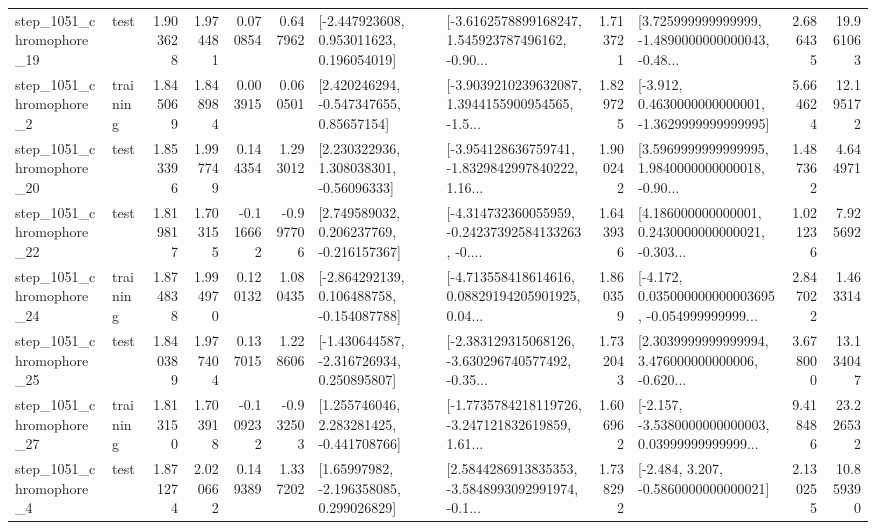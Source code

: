 \begin{tabular}{llrrrrllrlrr}
 step\_1051\_chromophore\_19 &      test &      1.903628 &    1.974481 &      0.070854 &  0.647962 &    [-2.447923608, 0.953011623, 0.196054019] &  [-3.6162578899168247, 1.545923787496162, -0.90... &       1.713721 &  [3.725999999999999, -1.4890000000000043, -0.48... &            2.686435 &         19.961063 \\
  step\_1051\_chromophore\_2 &  training &      1.845069 &    1.848984 &      0.003915 &  0.060501 &     [2.420246294, -0.547347655, 0.85657154] &  [-3.9039210239632087, 1.3944155900954565, -1.5... &       1.829725 &  [-3.912, 0.4630000000000001, -1.3629999999999995] &            5.664624 &         12.195172 \\
 step\_1051\_chromophore\_20 &      test &      1.853396 &    1.997749 &      0.144354 &  1.293012 &     [2.230322936, 1.308038301, -0.56096333] &  [-3.954128636759741, -1.8329842997840222, 1.16... &       1.900242 &  [3.5969999999999995, 1.9840000000000018, -0.90... &            1.487362 &          4.644971 \\
 step\_1051\_chromophore\_22 &      test &      1.819817 &    1.703155 &     -0.116662 & -0.997706 &    [2.749589032, 0.206237769, -0.216157367] &  [-4.314732360055959, -0.24237392584133263, -0.... &       1.643936 &  [4.186000000000001, 0.2430000000000021, -0.303... &            1.021236 &          7.925692 \\
 step\_1051\_chromophore\_24 &  training &      1.874838 &    1.994970 &      0.120132 &  1.080435 &   [-2.864292139, 0.106488758, -0.154087788] &  [-4.713558418614616, 0.08829194205901925, 0.04... &       1.860359 &  [-4.172, 0.035000000000003695, -0.054999999999... &            2.847022 &          1.463314 \\
 step\_1051\_chromophore\_25 &      test &      1.840389 &    1.977404 &      0.137015 &  1.228606 &   [-1.430644587, -2.316726934, 0.250895807] &  [-2.383129315068126, -3.630296740577492, -0.35... &       1.732043 &  [2.3039999999999994, 3.476000000000006, -0.620... &            3.678000 &         13.134047 \\
 step\_1051\_chromophore\_27 &  training &      1.813150 &    1.703918 &     -0.109232 & -0.932503 &    [1.255746046, 2.283281425, -0.441708766] &  [-1.7735784218119726, -3.247121832619859, 1.61... &       1.606962 &  [-2.157, -3.5380000000000003, 0.03999999999999... &            9.418486 &         23.226532 \\
  step\_1051\_chromophore\_4 &      test &      1.871274 &    2.020662 &      0.149389 &  1.337202 &     [1.65997982, -2.196358085, 0.299026829] &  [2.5844286913835353, -3.5848993092991974, -0.1... &       1.738292 &               [-2.484, 3.207, -0.5860000000000021] &            2.130255 &         10.859390 \\

\end{tabular}
